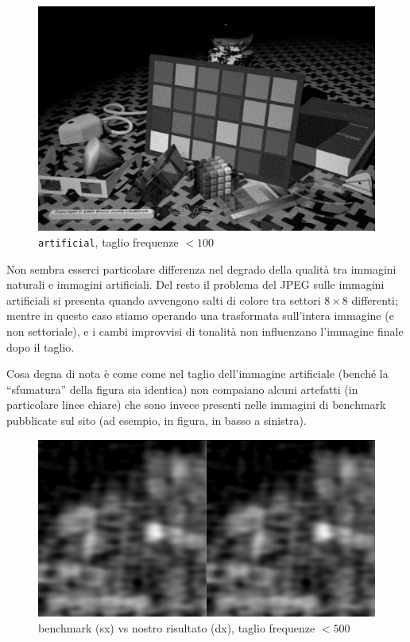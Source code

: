 \documentclass[11pt,a4paper]{scrartcl}
\begin{document}
\begin{figure}[!ht]
\centering
\includegraphics[scale=0.20]{images/artificialcut}
\caption{\texttt{artificial}, taglio frequenze $< 100$}
\end{figure}

\clearpage

Non sembra esserci particolare differenza nel degrado della qualità tra immagini naturali e immagini artificiali. Del resto il problema del JPEG sulle immagini artificiali si presenta quando avvengono salti di colore tra settori $8 \times 8$ differenti; mentre in questo caso stiamo operando una trasformata sull'intera immagine (e non settoriale), e i cambi improvvisi di tonalità non influenzano l'immagine finale dopo il taglio.

Cosa degna di nota è come come nel taglio dell'immagine artificiale (benché la ``sfumatura'' della figura sia identica) non compaiano alcuni artefatti (in particolare linee chiare) che sono invece presenti nelle immagini di benchmark pubblicate sul sito (ad esempio, in figura, in basso a sinistra).

\begin{figure}[!ht]
\centering
\includegraphics[scale=0.5]{images/cfrbenchmark}
\caption{benchmark (sx) vs nostro risultato (dx), taglio frequenze $< 500$}
\end{figure}
\end{document}
